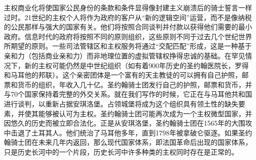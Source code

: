 \begin{Parallel}{97mm}{45mm}
  \ParallelRText
  {\small 主权商业化将使国家公民身份的条款和条件显得像封建主义崩溃后的骑士誓言一样过时。21世纪的主权个人将作为政府的客户从“新的逻辑空间”运营，而不是像纳税的公民那样与强大的国家有关。他们将按照合同谈判并付款以获得他们需要的最小政府。信息时代的政府将按照不同的原则组织，这些原则不同于过去几个世纪世界所期望的原则。一些司法管辖区和主权服务将通过“交配匹配”形成，这是一种基于亲和力（包括商业亲和力）而非地理位置的虚拟管辖权挣得忠诚的基础。在罕见情况下，新的主权可能仍然是中世纪组织（如有着900年历史的圣约翰医院长，罗得和马耳他的邦联）。这个亲密团体是一个富有的天主教徒的可以拥有自己护照，邮票和货币的组织，年收入几十亿。圣约翰骑士团发行自己的护照，邮票和货币，并与70个国家保持着完整的外交关系。就在我们写作的时候，它正在与马耳他共和国进行谈判，以重新占据安琪洛堡。占领城堡将成为这个组织具有领土性的缺失要素，并使其能够被认可为主权。圣约翰骑士团可能再次成为一个主权微型国家，并因悠久的历史而被立即合法化。正是从安琪洛堡，圣约翰骑士团在1565年的大围攻中击退了土耳其人。他们统治了马耳他多年，直到1798年被拿破仑驱逐。如果圣约翰骑士团在未来几年内返回，那么现代国家体系，即法国革命后出现的国家体系，只是历史长河中的一个片段，历史长河中许多种类的主权同时存在是正常的。}



\end{Parallel}
